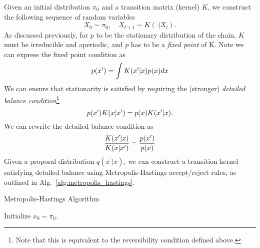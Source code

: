 \documentclass[../main.tex]{subfiles}
\begin{document}
Given an initial distribution $\pi_0$ and a transition matrix (kernel) $K$, we
construct the following sequence of random variables
%
\begin{equation}
  X_0 \sim \pi_0, \quad X_{t+1} \sim K(\cdot|X_t).
\end{equation}
%
As discussed previously, for $p$ to be the stationary distribution of the
chain, $K$ must be irreducible and aperiodic, and $p$ has to be a \emph{fixed
point} of K. Note we can express the fixed point condition as 
%
\begin{equation}
  p({x^{\prime}}) = \int K({x^{\prime}} | x) p(x) dx
\end{equation}
%
We can ensure that stationarity is satisfied by requiring the (stronger)
\emph{detailed balance condition}\footnote{Note that this is equivalent to the
reversibility condition defined above.}
%
\begin{equation}
  p{({x^{\prime}})} K{(x|{x^{\prime}})} = p{(x)} K{({x^{\prime}}|x)}.
\end{equation}
%
%
We can rewrite the detailed balance condition as 
%
\begin{equation}
  \frac{K{({x^{\prime}} | x)}}{K(x | {x^{\prime}})} = \frac{p({x^{\prime}})}{p(x)}
\end{equation}
%
Given a proposal distribution $q{(x^{\prime}|x)}$, we can construct a
transition kernel satisfying detailed balance using Metropolis-Hastings
accept/reject rules, as outlined in Alg.~\ref{alg:metropolis_hastings}.
%
\begin{algorithm}[htpb]%
  \AlgoDontDisplayBlockMarkers\SetAlgoNoEnd\SetAlgoNoLine%
  \DontPrintSemicolon%
  \caption{Metropolis-Hastings Algorithm}%
  \;
  Initialize $x_0 \sim \pi_0$.\;
\label{alg:metropolis_hastings}
\end{algorithm}
\end{document}
